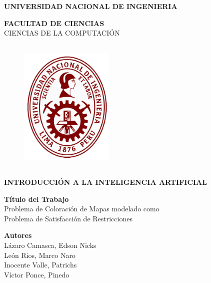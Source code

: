 \documentclass[a4paper]{article}
\begin{document}
\begin{titlepage}
\begin{center}
\vspace*{-0.4in}

{\fontsize{12}{30}\bf \selectfont UNIVERSIDAD NACIONAL DE INGENIERIA\\}

{\fontsize{12}{40}\bf \selectfont FACULTAD DE CIENCIAS\\}
\vspace*{0.15in} CIENCIAS DE LA COMPUTACI\'ON\\
\vspace*{0.2in}
\begin{figure}[htb]
\begin{center}
\includegraphics[width=4.5cm,height=6.5cm]{UNI.png}
\end{center}
\end{figure}
\begin{Large}
\textbf{INTRODUCCI\'ON A LA INTELIGENCIA ARTIFICIAL\\}
\end{Large}
\vspace*{0.2in}

\begin{large}
{\bf T\'itulo del Trabajo\\}
\vspace*{0.1in}
{\fontsize{12}{13}\selectfont 
Problema de Coloraci\'on de Mapas modelado como\\ Problema de Satisfacci\'on de Restricciones\\}
\end{large}
\vspace*{0.3in}

\begin{large}
{\bf Autores} 
\vspace*{0.1in}
\\L\'azaro Camasca, Edson Nicks\\
Le\'on Rios, Marco Naro \\Inocente Valle, Patrichs\\
V\'ictor Ponce, Pinedo
\end{large}


\end{center}
\end{titlepage}
\end{document}
